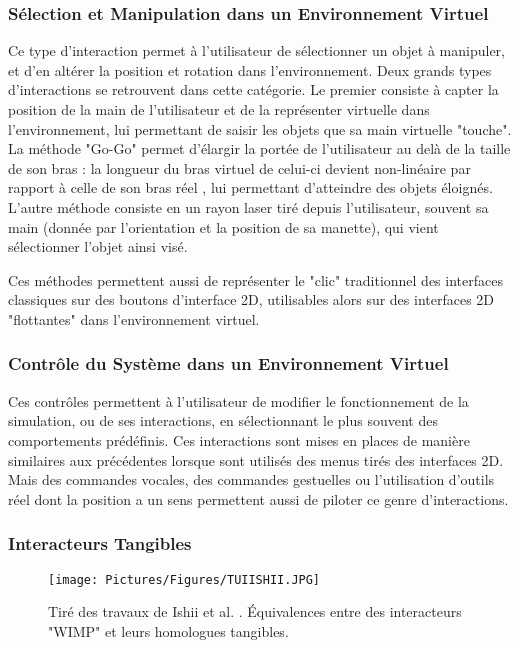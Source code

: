	\subsubsection{Sélection et Manipulation dans un Environnement Virtuel}
	Ce type d'interaction permet à l'utilisateur de sélectionner un objet à manipuler, et d'en altérer la position et rotation dans l'environnement. Deux grands types d'interactions se retrouvent dans cette catégorie. Le premier consiste à capter la position de la main de l'utilisateur et de la représenter virtuelle dans l'environnement, lui permettant de saisir les objets que sa main virtuelle "touche". La méthode "Go-Go" permet d'élargir la portée de l'utilisateur au delà de la taille de son bras : la longueur du bras virtuel de celui-ci devient non-linéaire par rapport à celle de son bras réel \cite{poupyrev_go-go_1996}, lui permettant d'atteindre des objets éloignés. L'autre méthode consiste en un rayon laser tiré depuis l'utilisateur, souvent sa main (donnée par l'orientation et la position de sa manette), qui vient sélectionner l'objet ainsi visé. 
	
	Ces méthodes permettent aussi de représenter le "clic" traditionnel des interfaces classiques sur des boutons d'interface 2D, utilisables alors sur des interfaces 2D "flottantes" dans l'environnement virtuel.
	
	\subsubsection{Contrôle du Système dans un Environnement Virtuel}
	Ces contrôles permettent à l'utilisateur de modifier le fonctionnement de la simulation, ou de ses interactions, en sélectionnant le plus souvent des comportements prédéfinis. Ces interactions sont mises en places de manière similaires aux précédentes lorsque sont utilisés des menus tirés des interfaces 2D. Mais des commandes vocales, des commandes gestuelles ou l'utilisation d'outils réel dont la position a un sens permettent aussi de piloter ce genre d'interactions.
	
	
	\subsubsection{Interacteurs Tangibles}
	
		\begin{figure}
			\centering
			\texttt{[image: Pictures/Figures/TUIISHII.JPG]}
			\caption{Tiré des travaux de Ishii et al. \cite{ishii_tangible_1997}. Équivalences entre des interacteurs "WIMP" et leurs homologues tangibles.}
			\label{TUIEx}
		\end{figure}	
	
